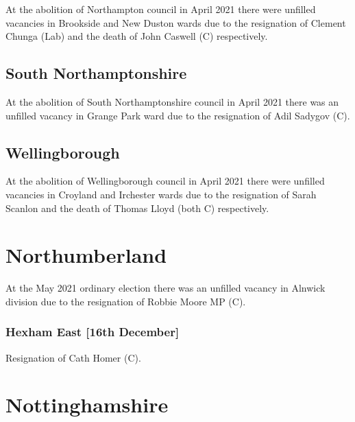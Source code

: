\documentclass[a4paper,openany]{book}
\begin{document}
\begin{resultsiii}
At the abolition of Northampton council in April 2021 there were unfilled vacancies in Brookside and New Duston wards due to the resignation of Clement Chunga (Lab) and the death of John Caswell (C) respectively.

\subsection*{South Northamptonshire}

At the abolition of South Northamptonshire council in April 2021 there was an unfilled vacancy in Grange Park ward due to the resignation of Adil Sadygov (C).

\subsection*{Wellingborough}

At the abolition of Wellingborough council in April 2021 there were unfilled vacancies in Croyland and Irchester wards due to the resignation of Sarah Scanlon and the death of Thomas Lloyd (both C) respectively.

\section{Northumberland}

At the May 2021 ordinary election there was an unfilled vacancy in Alnwick division due to the resignation of Robbie Moore MP (C).%

\subsubsection*{Hexham East \hspace*{\fill}\nolinebreak[1]%
	\enspace\hspace*{\fill}
	[16th December]}


Resignation of Cath Homer (C).

\section{Nottinghamshire}


\end{resultsiii}
\end{document}

